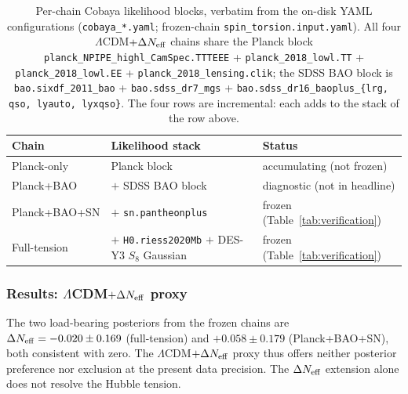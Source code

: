 \documentclass[aps,prd,twocolumn,superscriptaddress,showpacs,preprintnumbers,nofootinbib,longbibliography,floatfix]{revtex4-2}
\newcommand{\Neff}{N_{\rm eff}}
\begin{document}
\begin{table}[tb]
\caption{\label{tab:chain_datasets} Per-chain Cobaya likelihood blocks,
verbatim from the on-disk YAML configurations
(\texttt{cobaya\_*.yaml}; frozen-chain \texttt{spin\_torsion.input.yaml}).
All four
$\Lambda$CDM$+\Delta\Neff$ chains share the Planck block
\texttt{planck\_NPIPE\_highl\_CamSpec.TTTEEE} +
\texttt{planck\_2018\_lowl.TT} + \texttt{planck\_2018\_lowl.EE} +
\texttt{planck\_2018\_lensing.clik}; the SDSS BAO block is
\texttt{bao.sixdf\_2011\_bao} + \texttt{bao.sdss\_dr7\_mgs} +
\texttt{bao.sdss\_dr16\_baoplus\_\{lrg,\,qso,\,lyauto,\,lyxqso\}}.
The four rows are incremental: each adds to the stack of the row
above.}
\begin{ruledtabular}
\footnotesize
\begin{tabular}{lll}
Chain & Likelihood stack & Status \\
\hline
Planck-only & Planck block & accumulating (not frozen) \\
Planck+BAO & $+$ SDSS BAO block & diagnostic (not in headline) \\
Planck+BAO+SN & $+$ \texttt{sn.pantheonplus} & frozen (Table~\ref{tab:verification}) \\
Full-tension & $+$ \texttt{H0.riess2020Mb} $+$ DES-Y3 $S_8$ Gaussian & frozen (Table~\ref{tab:verification}) \\
\end{tabular}
\end{ruledtabular}
\end{table}

\subsubsection{Results: $\Lambda$CDM$+\Delta N_{\rm eff}$ proxy}

The two load-bearing posteriors from the frozen chains are
$\Delta N_{\rm eff} = -0.020 \pm 0.169$ (full-tension) and
$+0.058 \pm 0.179$ (Planck+BAO+SN), both consistent with zero.
The $\Lambda$CDM$+\Delta\Neff$ proxy thus offers neither posterior
preference nor exclusion at the present data precision. The
$\Delta\Neff$ extension alone does not resolve the Hubble tension.
\end{document}
